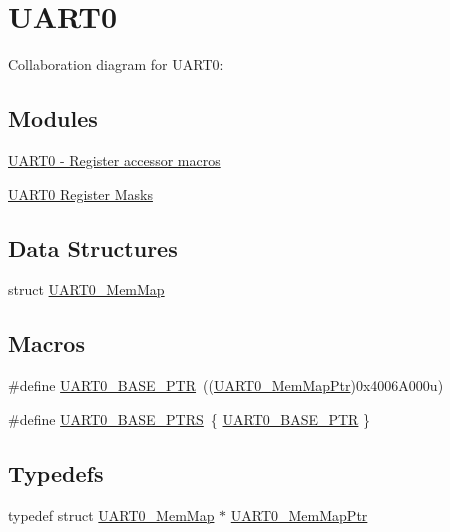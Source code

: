 \hypertarget{group___u_a_r_t0___peripheral}{}\section{U\+A\+R\+T0}
\label{group___u_a_r_t0___peripheral}
Collaboration diagram for U\+A\+R\+T0\+:
\subsection*{Modules}
\begin{DoxyCompactItemize}
\item 
\hyperlink{group___u_a_r_t0___register___accessor___macros}{U\+A\+R\+T0 -\/ Register accessor macros}
\item 
\hyperlink{group___u_a_r_t0___register___masks}{U\+A\+R\+T0 Register Masks}
\end{DoxyCompactItemize}
\subsection*{Data Structures}
\begin{DoxyCompactItemize}
\item 
struct \hyperlink{struct_u_a_r_t0___mem_map}{U\+A\+R\+T0\+\_\+\+Mem\+Map}
\end{DoxyCompactItemize}
\subsection*{Macros}
\begin{DoxyCompactItemize}
\item 
\#define \hyperlink{group___u_a_r_t0___peripheral_ga50a02c91ffbd11fa7b4f0c33fe585199}{U\+A\+R\+T0\+\_\+\+B\+A\+S\+E\+\_\+\+P\+TR}~((\hyperlink{group___u_a_r_t0___peripheral_gae795171499e041fb9b8f6ad5b97f896b}{U\+A\+R\+T0\+\_\+\+Mem\+Map\+Ptr})0x4006\+A000u)
\item 
\#define \hyperlink{group___u_a_r_t0___peripheral_ga9416d89d2bc04eb37311da5910f1c701}{U\+A\+R\+T0\+\_\+\+B\+A\+S\+E\+\_\+\+P\+T\+RS}~\{ \hyperlink{group___u_a_r_t0___peripheral_ga50a02c91ffbd11fa7b4f0c33fe585199}{U\+A\+R\+T0\+\_\+\+B\+A\+S\+E\+\_\+\+P\+TR} \}
\end{DoxyCompactItemize}
\subsection*{Typedefs}
\begin{DoxyCompactItemize}
\item 
typedef struct \hyperlink{struct_u_a_r_t0___mem_map}{U\+A\+R\+T0\+\_\+\+Mem\+Map} $\ast$ \hyperlink{group___u_a_r_t0___peripheral_gae795171499e041fb9b8f6ad5b97f896b}{U\+A\+R\+T0\+\_\+\+Mem\+Map\+Ptr}
\end{DoxyCompactItemize}


